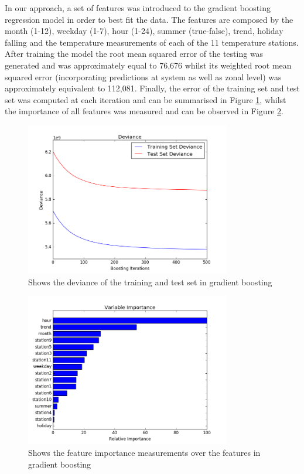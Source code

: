 \documentclass{article} %
\begin{document}
In our approach, a set of features was introduced to the gradient boosting regression model in order to best fit the data. The features are composed by the month (1-12), weekday (1-7), hour (1-24), summer (true-false), trend, holiday falling and the temperature measurements of each of the 11 temperature stations. After training the model the root mean squared error of the testing was generated and was approximately equal to 76,676 whilst its weighted root mean squared error (incorporating predictions at system as well as zonal level) was approximately equivalent to 112,081. Finally, the error of the training set and test set was computed at each iteration and can be summarised in Figure \ref{fig:deviance}, whilst the importance of all features was measured and can be observed in Figure \ref{fig:boost_imp}.
\begin{figure}[H]
  \centering
    \includegraphics[width=0.80\textwidth]{deviance}
  \caption{Shows the deviance of the training and test set in gradient boosting}
  \label{fig:deviance}
\end{figure}
\begin{figure}[H]
  \centering
    \includegraphics[width=0.80\textwidth]{boost_imp}
  \caption{Shows the feature importance measurements over the features in gradient boosting}
  \label{fig:boost_imp}
\end{figure}
\end{document}
